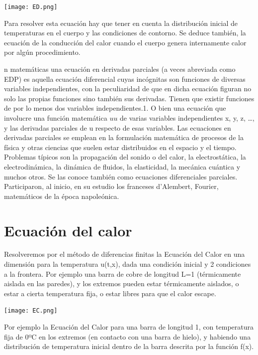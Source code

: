 \documentclass[12pt]{article}
\begin{document}
\begin{center}
    \texttt{[image: ED.png]}\\
\end{center}

Para resolver esta ecuación hay que tener en cuenta la distribución inicial de temperaturas en el cuerpo y las condiciones de contorno. Se deduce también, la ecuación de la conducción del calor cuando el cuerpo genera internamente calor por algún procedimiento.

n matemáticas una ecuación en derivadas parciales (a veces abreviada como EDP) es aquella ecuación diferencial cuyas incógnitas son funciones de diversas variables independientes, con la peculiaridad de que en dicha ecuación figuran no solo las propias funciones sino también sus derivadas. Tienen que existir funciones de por lo menos dos variables independientes.1. O bien una ecuación que involucre una función matemática ${\displaystyle u}u$ de varias variables independientes x, y, z, …, y las derivadas parciales de u respecto de esas variables. Las ecuaciones en derivadas parciales se emplean en la formulación matemática de procesos de la física y otras ciencias que suelen estar distribuidos en el espacio y el tiempo. Problemas típicos son la propagación del sonido o del calor, la electrostática, la electrodinámica, la dinámica de fluidos, la elasticidad, la mecánica cuántica y muchos otros. Se las conoce también como ecuaciones diferenciales parciales. Participaron, al inicio, en su estudio los franceses d'Alembert, Fourier, matemáticos de la época napoleónica.




\section*{Ecuación del calor}

Resolveremos por el método de diferencias finitas la Ecuación del Calor en una dimensión para la temperatura u(t,x), dada una condición inicial y 2 condiciones a la frontera. Por ejemplo una barra de cobre de longitud L=1 (térmicamente aislada en las paredes), y los extremos pueden estar térmicamente aislados, o estar a cierta temperatura fija, o estar libres para que el calor escape.

\begin{center}
    \texttt{[image: EC.png]}
\end{center}

Por ejemplo la Ecuación del Calor para una barra de longitud 1, con temperatura fija de 0ºC en los extremos (en contacto con una barra de hielo), y habiendo una distribución de temperatura inicial dentro de la barra descrita por la función f(x). 
\end{document}
